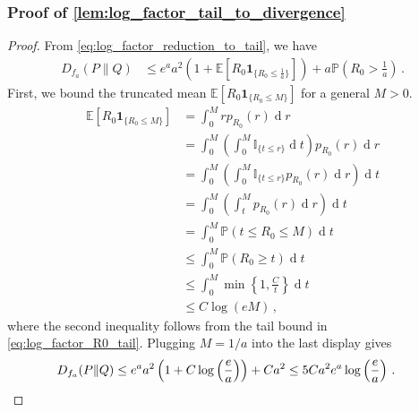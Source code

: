 \documentclass{article}
\theoremstyle{plain}
\theoremstyle{definition}
\theoremstyle{plain}
\newcommand{\E}{\mathbb E}
\newcommand{\PP}{\mathbb P}
\renewcommand{\d}[1]{\operatorname{d}\!#1}
\begin{document}
\subsubsection{Proof of \cref{lem:log_factor_tail_to_divergence}}
\label{proof:log_factor_tail_to_divergence}
\begin{proof}
    From \cref{eq:log_factor_reduction_to_tail}, we have
    \begin{align}
        D_{f_a}(P\|Q)
         & \le
        e^a
        a^2
        \left(
        1+\E[R_0\mathbf{1}_{\{R_0\le \frac{1}{a}\}}]
        \right)
        +
        a \PP\left(R_0>\frac{1}{a}\right)\,.
    \end{align}
    First, we bound the truncated mean $\E[R_0\mathbf{1}_{\{R_0\le M\}}]$ for a general $M>0$.
    \begin{align}
        \E[R_0\mathbf{1}_{\{R_0\le M\}}]
         & = \int_0^M r p_{R_0}(r) \d r
        \\
         & = \int_0^M \left(\int_{0}^{M} \mathbb{I}_{\{t \le r\}} \d t \right) p_{R_0}(r) \d r
        \\
         & = \int_0^M \left( \int_{0}^{M} \mathbb{I}_{\{t \le r\}}  p_{R_0}(r) \d r \right) \d t
        \\
         & = \int_0^M \left( \int_{t}^{M} p_{R_0}(r) \d r \right) \d t
        \\
         & = \int_0^M \PP\left( t \leq R_0 \leq M \right) \d t
        \\
         & \leq \int_0^M \PP\left( R_0 \geq t \right) \d t
        \\
         & \le
        \int_0^M
        \min\left\{
        1,\frac{C}{t}
        \right\}
        \d t
        \\
         & \le
        C\log(eM)\,,
    \end{align}
    where the second inequality follows from the tail bound in \eqref{eq:log_factor_R0_tail}.
    Plugging $M=1/a$ into the last display gives
    \begin{align}
        D_{f_a}(P\|Q)
         & \le
        e^a a^2
        \left(
        1+C\log\left(\frac{e}{a}\right)
        \right)
        +
        C a^2
        \le
        5C
        a^2 e^a \log\left(\frac{e}{a}\right)\,. \qedhere
    \end{align}
\end{proof}
\end{document}
